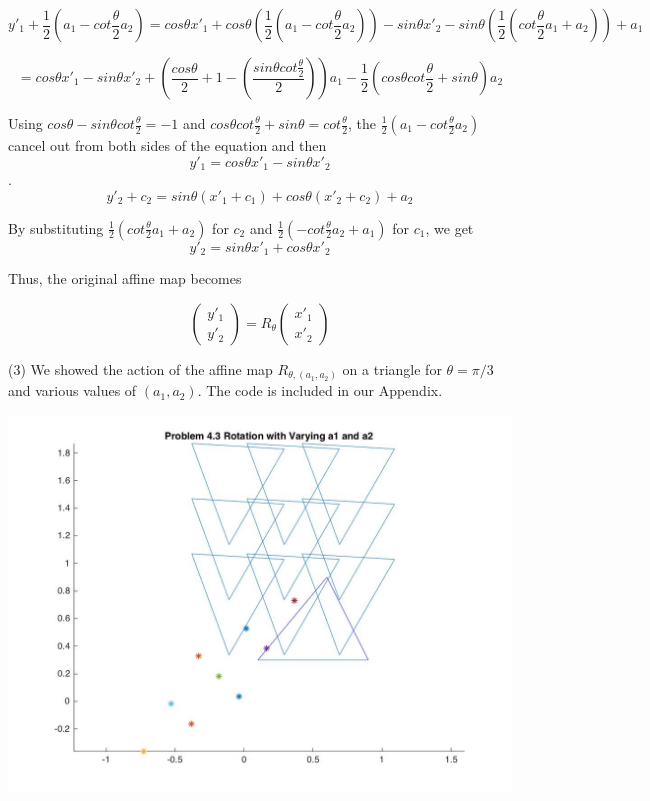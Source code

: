 \documentclass[12pt]{article}
\begin{document}
\[y'_1 + \frac{1}{2}(a_1 - cot\frac{\theta}{2} a_2) =  cos\theta x'_1 + cos\theta (\frac{1}{2}(a_1 - cot \frac{\theta}{2} a_2)) - sin\theta x'_2 - sin\theta (\frac{1}{2} (cot \frac{\theta}{2}a_1 + a_2)) + a_1 \]

$$ = cos\theta x'_1  - sin\theta x'_2 + (\frac {cos\theta}{2} + 1 - (\frac{sin\theta cot \frac{\theta}{2}}{2} ))a_1 - \frac{1}{2}(cos\theta cot \frac{\theta}{2} + sin\theta) a_2$$

Using $cos\theta - sin\theta cot \frac{\theta}{2} = -1$ and $cos\theta cot \frac{\theta}{2} + sin\theta = cot \frac{\theta}{2}$, the $\frac{1}{2} (a_1 - cot \frac{\theta}{2}a_2)$ cancel out from both sides of the equation and then $$y'_1 = cos\theta x'_1 - sin\theta x'_2$$.
$$y'_2 + c_2 = sin\theta (x'_1+ c_1) + cos\theta (x'_2 +c_2) + a_2$$

By substituting $\frac{1}{2} \left( cot \frac{\theta}{2} a_1+a_2 \right)$ for $c_2$ and $\frac{1}{2} \left( -cot \frac{\theta}{2} a_2+a_1 \right)$ for $c_1$, we get\\ 

 $$y'_2 = sin\theta x'_1 + cos\theta x'_2$$
 
 Thus, the original affine map becomes 
 
 $$ \begin{pmatrix}y'_1 \\y'_2\end{pmatrix}= R_\theta \begin{pmatrix}x'_1 \\x'_2\end{pmatrix}$$

\medskip
(3)
We showed the action of the affine map $R_{\theta, (a_1,a_2)}$ on a triangle for  $\theta = \pi/3$ and various values of $(a_1, a_2)$. The code is included in our Appendix. 

\includegraphics[scale=.25]{Plot4_3}
\end{document}
